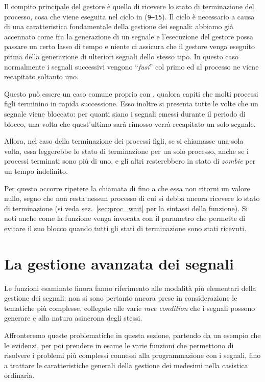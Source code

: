 Il compito principale del gestore è quello di ricevere lo stato di
terminazione del processo, cosa che viene eseguita nel ciclo in
(\texttt{\small 9--15}).  Il ciclo è necessario a causa di una caratteristica
fondamentale della gestione dei segnali: abbiamo già accennato come fra la
generazione di un segnale e l'esecuzione del gestore possa passare un certo
lasso di tempo e niente ci assicura che il gestore venga eseguito prima della
generazione di ulteriori segnali dello stesso tipo. In questo caso normalmente
i segnali successivi vengono ``\textsl{fusi}'' col primo ed al processo ne
viene recapitato soltanto uno.

Questo può essere un caso comune proprio con , qualora capiti
che molti processi figli terminino in rapida successione. Esso inoltre si
presenta tutte le volte che un segnale viene bloccato: per quanti siano i
segnali emessi durante il periodo di blocco, una volta che quest'ultimo sarà
rimosso verrà recapitato un solo segnale.

Allora, nel caso della terminazione dei processi figli, se si chiamasse
 una sola volta, essa leggerebbe lo stato di terminazione per un
solo processo, anche se i processi terminati sono più di uno, e gli altri
resterebbero in stato di \textit{zombie} per un tempo indefinito.

Per questo occorre ripetere la chiamata di  fino a che essa non
ritorni un valore nullo, segno che non resta nessun processo di cui si debba
ancora ricevere lo stato di terminazione (si veda sez.~\ref{sec:proc_wait} per
la sintassi della funzione). Si noti anche come la funzione venga invocata con
il parametro  che permette di evitare il suo blocco quando
tutti gli stati di terminazione sono stati ricevuti.



\section{La gestione avanzata dei segnali}
\label{sec:sig_adv_control}

Le funzioni esaminate finora fanno riferimento alle modalità più elementari
della gestione dei segnali; non si sono pertanto ancora prese in
considerazione le tematiche più complesse, collegate alle varie \textit{race
  condition} che i segnali possono generare e alla natura asincrona degli
stessi.

Affronteremo queste problematiche in questa sezione, partendo da un esempio
che le evidenzi, per poi prendere in esame le varie funzioni che permettono di
risolvere i problemi più complessi connessi alla programmazione con i segnali,
fino a trattare le caratteristiche generali della gestione dei medesimi nella
casistica ordinaria.


